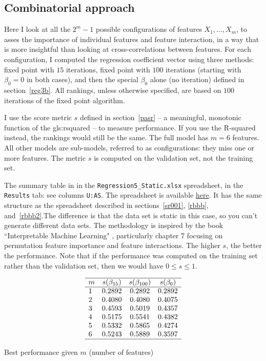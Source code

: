 \documentclass[oneside,10pt]{book}
\begin{document}
\subsection{Combinatorial approach} \label{combor1}

Here I look at all the  $2^m - 1$ possible configurations of features $X_1,\dots,X_m$, to asses the importance of individual features and feature interaction, in a way that is more insightful than looking at cross-correlations between features. For each configuration, I computed the regression coefficient vector using three methods: fixed point with $15$ iterations, fixed point with $100$ iterations (starting with $\beta_0=0$ in both cases), and then the special $\beta_0$ alone (no iteration) defined 
in section~\ref{reg3b}. All rankings, unless otherwise specified, are based on  $100$ iterations of the fixed point algorithm. 

I use the score metric $s$ defined in section~\ref{pasr} -- a meaningful, monotonic function of the \gls{gls:rsquared} -- to measure performance. If you use the R-squared instead, the rankings would still be the same. The full model has $m=6$ features. All other models are sub-models, referred to as configurations: they miss one or more features. The metric $s$ is computed on the validation set, not the training set. 

The summary table in in the \texttt{Regression5\_Static.xlsx} spreadsheet, in the \texttt{Results} tab: see columns \texttt{U:AS}. 
The spreadsheet is available \href{https://github.com/VincentGranville/Machine-Learning/blob/main/Spreadsheets/README.md}{here}. It has the same structure as the spreadsheet described in sections~\ref{sr001}, \ref{rbbb}, and~\ref{rbbb2}.The difference is that the data set is static in this case, so you can't generate different data sets. The methodology is inspired by the book ``Interpretable Machine Learning" \cite{cmol}, particularly chapter 7 focusing on permutation feature importance and feature interactions. The higher $s$, the better the performance. Note that if the performance was computed on the training set rather than the validation set, then we would have $0\leq s\leq 1$. 



\begin{table}%
\[
\begin{array}{lccc}
\hline
 m &  s(\beta_{15}) & s(\beta_{100}) & s(\beta_0)  \\
\hline
1 & 0.2892 &	0.2892 &	0.2892\\
2 &	0.4080 &	0.4080 &	0.4075\\
3 &	0.4593 &	0.5019 &	0.4357\\
4 &	0.5175 &	0.5541 &	0.4382\\
5 &	0.5332 &	0.5865 &	0.4274\\
6 &	0.5243 &	0.5889 &	0.3597\\
\hline
\end{array}
\]
\caption{\label{tabrr123}Best performance given $m$ (number of features)}
\end{table}
\end{document}
